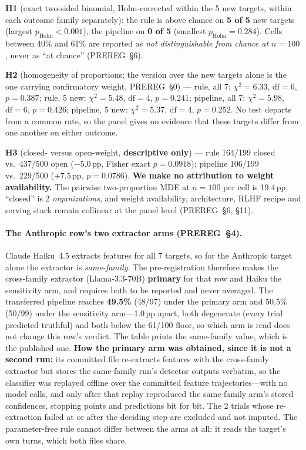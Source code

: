 \textbf{H1} (exact two-sided binomial, Holm-corrected within the 5 new targets, within each outcome family separately): the rule is above chance on \textbf{5 of 5} new targets (largest $p_{\mathrm{Holm}}\!<\!0.001$), the pipeline on \textbf{0 of 5} (smallest $p_{\mathrm{Holm}}\!=\!0.284$). Cells between 40\% and 61\% are reported as \emph{not distinguishable from chance at $n\!=\!100$}, never as ``at chance'' (PREREG~§6).

\textbf{H2} (homogeneity of proportions; the version over the new targets alone is the one carrying confirmatory weight, PREREG~§0) --- rule, all 7: $\chi^2\!=\!6.33$, $\mathrm{df}\!=\!6$, $p\!=\!0.387$; rule, 5 new: $\chi^2\!=\!5.48$, $\mathrm{df}\!=\!4$, $p\!=\!0.241$; pipeline, all 7: $\chi^2\!=\!5.98$, $\mathrm{df}\!=\!6$, $p\!=\!0.426$; pipeline, 5 new: $\chi^2\!=\!5.37$, $\mathrm{df}\!=\!4$, $p\!=\!0.252$. No test departs from a common rate, so the panel gives no evidence that these targets differ from one another on either outcome.

\textbf{H3} (closed- versus open-weight, \textbf{descriptive only}) --- rule 164/199 closed vs.\ 437/500 open ($-5.0$\,pp, Fisher exact $p\!=\!0.0918$); pipeline 106/199 vs.\ 229/500 ($+7.5$\,pp, $p\!=\!0.0786$). \textbf{We make no attribution to weight availability.} The pairwise two-proportion MDE at $n\!=\!100$ per cell is 19.4\,pp, ``closed'' is 2 \emph{organizations}, and weight availability, architecture, RLHF recipe and serving stack remain collinear at the panel level (PREREG~§6, §11).

\paragraph{The Anthropic row's two extractor arms (PREREG~§4).}
Claude Haiku~4.5 extracts features for all 7 targets, so for the Anthropic target alone the extractor is \emph{same-family}. The pre-registration therefore makes the cross-family extractor (Llama-3.3-70B) \textbf{primary} for that row and Haiku the sensitivity arm, and requires both to be reported and never averaged. The transferred pipeline reaches \textbf{49.5\%} (48/97) under the primary arm and 50.5\% (50/99) under the sensitivity arm---1.0\,pp apart, both degenerate (every trial predicted truthful) and both below the 61/100 floor, so which arm is read does not change this row's verdict. The table prints the same-family value, which is the published one. \textbf{How the primary arm was obtained, since it is not a second run:} its committed file re-extracts features with the cross-family extractor but stores the same-family run's detector outputs verbatim, so the classifier was replayed offline over the committed feature trajectories---with no model calls, and only after that replay reproduced the same-family arm's stored confidences, stopping points and predictions bit for bit. The 2 trials whose re-extraction failed at or after the deciding step are excluded and not imputed. The parameter-free rule cannot differ between the arms at all: it reads the target's own turns, which both files share.

